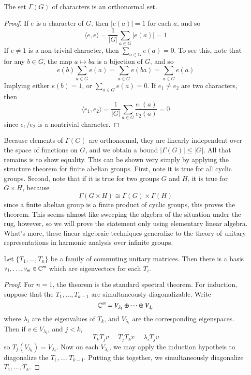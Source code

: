 \begin{theorem}
    The set $\Gamma(G)$ of characters is an orthonormal set.
\end{theorem}
\begin{proof}
    If $e$ is a character of $G$, then $|e(a)| = 1$ for each $a$, and so
    \[ \langle e, e \rangle = \frac{1}{|G|} \sum_{a \in G} |e(a)| = 1 \]
    If $e \neq 1$ is a non-trivial character, then $\sum_{a \in G} e(a) = 0$. To see this, note that for any $b \in G$, the map $a \mapsto ba$ is a bijection of $G$, and so
    \[ e(b) \sum_{a \in G} e(a) = \sum_{a \in G} e(ba) = \sum_{a \in G} e(a) \]
    Implying either $e(b) = 1$, or $\sum_{a \in G} e(a) = 0$. If $e_1 \neq e_2$ are two characters, then
    \[ \langle e_1, e_2 \rangle = \frac{1}{|G|} \sum_{a \in G} \frac{e_1(a)}{e_2(a)} = 0 \]
    since $e_1/e_2$ is a nontrivial character.
\end{proof}

Because elements of $\Gamma(G)$ are orthonormal, they are linearly independent over the space of functions on $G$, and we obtain a bound $|\Gamma(G)| \leq |G|$. All that remains is to show equality. This can be shown very simply by applying the structure theorem for finite abelian groups. First, note it is true for all cyclic groups. Second, note that if it is true for two groups $G$ and $H$, it is true for $G \times H$, because
%
\[ \Gamma(G \times H) \cong \Gamma(G) \times \Gamma(H) \]
%
since a finite abelian group is a finite product of cyclic groups, this proves the theorem. This seems almost like sweeping the algebra of the situation under the rug, however, so we will prove the statement only using elementary linear algebra. What's more, these linear algebraic techniques generalize to the theory of unitary representations in harmonic analysis over infinite groups.

\begin{theorem}
    Let $\{ T_1, \dots, T_n \}$ be a family of commuting unitary matrices. Then there is a basis $v_1, \dots, v_m \in \operatorname{\mathbb{C}}^m$ which are eigenvectors for each $T_i$.
\end{theorem}
\begin{proof}
    For $n = 1$, the theorem is the standard spectral theorem. For induction, suppose that the $T_1, \dots, T_{k-1}$ are simultaneously diagonalizable. Write
    \[ \operatorname{\mathbb{C}}^m = V_{\lambda_1} \oplus \dots \oplus V_{\lambda_l} \]
    where $\lambda_i$ are the eigenvalues of $T_k$, and $V_{\lambda_i}$ are the corresponding eigenspaces. Then if $v \in V_{\lambda_i}$, and $j < k$,
    \[ T_k T_j v = T_j T_k v = \lambda_i T_j v \]
    so $T_j(V_{\lambda_i}) = V_{\lambda_i}$. Now on each $V_{\lambda_i}$, we may apply the induction hypotheis to diagonalize the $T_1, \dots, T_{k-1}$. Putting this together, we simultaneously diagonalize $T_1, \dots, T_k$.
\end{proof}

